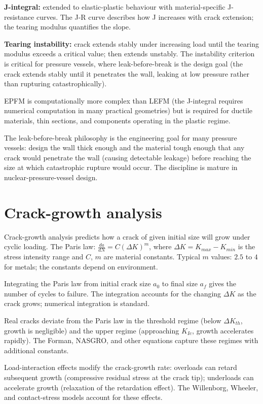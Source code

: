 \textbf{J-integral:} extended to elastic-plastic behaviour with material-specific J-resistance curves. The J-R curve describes how J increases with crack extension; the tearing modulus quantifies the slope.

\textbf{Tearing instability:} crack extends stably under increasing load until the tearing modulus exceeds a critical value; then extends unstably. The instability criterion is critical for pressure vessels, where leak-before-break is the design goal (the crack extends stably until it penetrates the wall, leaking at low pressure rather than rupturing catastrophically).

EPFM is computationally more complex than LEFM (the J-integral requires numerical computation in many practical geometries) but is required for ductile materials, thin sections, and components operating in the plastic regime.

The leak-before-break philosophy is the engineering goal for many pressure vessels: design the wall thick enough and the material tough enough that any crack would penetrate the wall (causing detectable leakage) before reaching the size at which catastrophic rupture would occur. The discipline is mature in nuclear-pressure-vessel design.

\section{Crack-growth analysis}

Crack-growth analysis predicts how a crack of given initial size will grow under cyclic loading. The Paris law: $\frac{da}{dN} = C (\Delta K)^m$, where $\Delta K = K_{max} - K_{min}$ is the stress intensity range and $C$, $m$ are material constants. Typical $m$ values: $2.5$ to $4$ for metals; the constants depend on environment.

Integrating the Paris law from initial crack size $a_0$ to final size $a_f$ gives the number of cycles to failure. The integration accounts for the changing $\Delta K$ as the crack grows; numerical integration is standard.

Real cracks deviate from the Paris law in the threshold regime (below $\Delta K_{th}$, growth is negligible) and the upper regime (approaching $K_{Ic}$, growth accelerates rapidly). The Forman, NASGRO, and other equations capture these regimes with additional constants.

Load-interaction effects modify the crack-growth rate: overloads can retard subsequent growth (compressive residual stress at the crack tip); underloads can accelerate growth (relaxation of the retardation effect). The Willenborg, Wheeler, and contact-stress models account for these effects.

